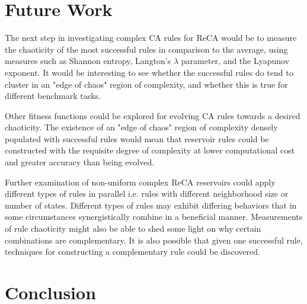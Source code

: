 \documentclass{elsarticle}
\begin{document}
\begin{multicols}{2}
\section{Future Work}\label{future_work}
The next step in investigating complex CA rules for ReCA would be to measure 
the chaoticity of the most successful rules in comparison to the average, using 
measures such as Shannon entropy, Langton's $\lambda$ parameter, and the 
Lyapunov exponent. It would be interesting to see whether the successful rules 
do tend to cluster in an "edge of chaos" region of complexity, and whether this
is true for different benchmark tasks. \par Other fitness functions could be 
explored for evolving CA rules towards a desired chaoticity. The existence of 
an "edge of chaos" region of complexity densely populated with successful rules 
would mean that reservoir rules could be constructed with the requisite degree 
of complexity at lower computational cost and greater accuracy than being 
evolved.  \par Further examination of non-uniform complex ReCA reservoirs could 
apply different types of rules in parallel i.e.  rules with different 
neighborhood size or number of states.  Different types of rules may exhibit 
differing behaviors that in some circumstances synergistically combine in a 
beneficial manner.  Measurements of rule chaoticity might also be able to shed 
some light on why certain combinations are complementary. It is also possible 
that given one successful rule, techniques for constructing a complementary 
rule could be discovered.

\fi
\section{Conclusion}\label{conclusion}



\end{multicols}
\end{document}
